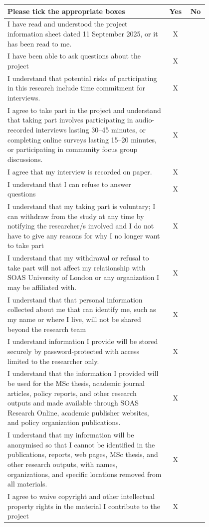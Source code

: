 \begin{longtable}{>{\raggedright\arraybackslash}p{0.8\linewidth} c c}
	\hline
	\textbf{Please tick the appropriate boxes} & \textbf{Yes} & \textbf{No} \\
	\hline
	I have read and understood the project information sheet dated 11 September 2025, or it has been read to me. & X & \\
	\hline
	I have been able to ask questions about the project & X & \\
	\hline
	I understand that potential risks of participating in this research include time commitment for interviews. & X & \\
	\hline
	I agree to take part in the project and understand that taking part involves participating in audio-recorded interviews lasting 30--45 minutes, or completing online surveys lasting 15--20 minutes, or participating in community focus group discussions. & X & \\
	\hline
	I agree that my interview is recorded on paper. & X & \\
	\hline
	I understand that I can refuse to answer questions & X & \\
	\hline
	I understand that my taking part is voluntary; I can withdraw from the study at any time by notifying the researcher/s involved and I do not have to give any reasons for why I no longer want to take part & X & \\
	\hline
	I understand that my withdrawal or refusal to take part will not affect my relationship with SOAS University of London or any organization I may be affiliated with. & X & \\
	\hline
	I understand that that personal information collected about me that can identify me, such as my name or where I live, will not be shared beyond the research team & X & \\
	\hline
	I understand information I provide will be stored securely by password-protected with access limited to the researcher only. & X & \\
	\hline
	I understand that the information I provided will be used for the MSc thesis, academic journal articles, policy reports, and other research outputs and made available through SOAS Research Online, academic publisher websites, and policy organization publications. & X & \\
	\hline
	I understand that my information will be anonymised so that I cannot be identified in the publications, reports, web pages, MSc thesis, and other research outputs, with names, organizations, and specific locations removed from all materials. & X & \\
	\hline
	I agree to waive copyright and other intellectual property rights in the material I contribute to the project & X & \\
	\hline
\end{longtable}

